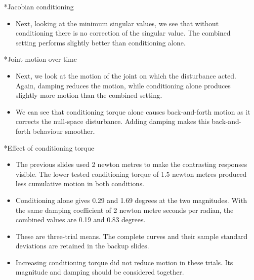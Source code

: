 \documentclass[12pt,a4paper]{article}
\makeatletter
\renewcommand\section{\@startsection{section}{1}{0pt}{14pt}{6pt}{\normalfont\Large\bfseries\color{navy}}}
\makeatother
\begin{document}
\section*{Jacobian conditioning}
\begin{itemize}
\item Next, looking at the minimum singular values, we see that without conditioning there is no correction of the singular value. The combined setting performs slightly better than conditioning alone.
\end{itemize}

\section*{Joint motion over time}
\begin{itemize}
\item Next, we look at the motion of the joint on which the disturbance acted. Again, damping reduces the motion, while conditioning alone produces slightly more motion than the combined setting.
\item We can see that conditioning torque alone causes back-and-forth motion as it corrects the null-space disturbance. Adding damping makes this back-and-forth behaviour smoother.
\end{itemize}

\section*{Effect of conditioning torque}
\begin{itemize}
\item The previous slides used 2 newton metres to make the contrasting responses visible. The lower tested conditioning torque of 1.5 newton metres produced less cumulative motion in both conditions.
\item Conditioning alone gives 0.29 and 1.69 degrees at the two magnitudes. With the same damping coefficient of 2 newton metre seconds per radian, the combined values are 0.19 and 0.83 degrees.
\item These are three-trial means. The complete curves and their sample standard deviations are retained in the backup slides.
\item Increasing conditioning torque did not reduce motion in these trials. Its magnitude and damping should be considered together.
\end{itemize}
\end{document}
